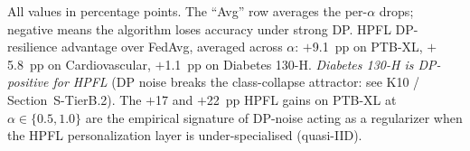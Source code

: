 \documentclass[conference]{IEEEtran}
\begin{document}
\begin{table}[htbp]
\centering
\caption{DP-resilience: drop (or gain) in accuracy from No-DP to $\varepsilon{=}1$ (strong privacy) per $(\alpha,\text{algorithm})$ cell, on the three Tier~B+ datasets. Negative $\Delta$ is a drop; positive $\Delta$ indicates the DP-noise improves accuracy (regularization effect, see K15 commentary).}
\label{tab:tier_b_dp_resilience}
\small
\setlength{\tabcolsep}{4pt}

\vspace{1mm}
\footnotesize{All values in percentage points. The ``Avg'' row averages the per-$\alpha$ drops; negative means the algorithm loses accuracy under strong DP. HPFL DP-resilience advantage over FedAvg, averaged across $\alpha$: $+$9.1~pp on PTB-XL, $+$5.8~pp on Cardiovascular, $+$1.1~pp on Diabetes 130-H. \emph{Diabetes 130-H is DP-positive for HPFL} (DP noise breaks the class-collapse attractor: see K10 / Section~S-TierB.2). The $+$17 and $+$22~pp HPFL gains on PTB-XL at $\alpha\in\{0.5, 1.0\}$ are the empirical signature of DP-noise acting as a regularizer when the HPFL personalization layer is under-specialised (quasi-IID).}
\end{table}
\end{document}
